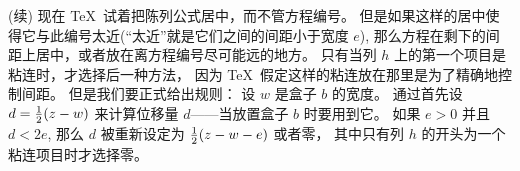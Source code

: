 \ddanger (续) 现在 \TeX\ 试着把陈列公式居中，而不管方程编号。%
但是如果这样的居中使得它与此编号太近(``太近''就是它们之间的间距小于宽度 $e$),
\1那么方程在剩下的间距上居中，或者放在离方程编号尽可能远的地方。%
只有当列 $h$ 上的第一个项目是粘连时，才选择后一种方法，
因为 \TeX\ 假定这样的粘连放在那里是为了精确地控制间距。%
但是我们要正式给出规则：
设 $w$ 是盒子 $b$ 的宽度。%
通过首先设 $d={1\over2}(z-w)$ 来计算位移量 $d$——当放置盒子 $b$ 时要用到它。%
如果 $e>0$ 并且 $d<2e$, 那么 $d$ 被重新设定为 ${1\over2}(z-w-e)$ 或者零，
其中只有列 $h$ 的开头为一个粘连项目时才选择零。

